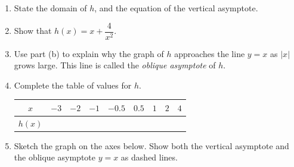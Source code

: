 \documentclass[12pt, twoside]{article}
\begin{document}
\begin{enumerate}[itemsep=0.4cm]
\begin{enumerate}[label=(\alph*), itemsep=0.25cm]
  \item State the domain of $h$, and the equation of the vertical
  asymptote.

  \vspace{0.5cm}

  \item Show that $\displaystyle h(x)=x+\dfrac{4}{x^2}$.

  \vspace{1.8cm}

  \item Use part (b) to explain why the graph of $h$ approaches
  the line $y=x$ as $|x|$ grows large. This line is called the
  \emph{oblique asymptote} of $h$.

  \vspace{1.6cm}

  \item Complete the table of values for $h$.
  \vspace{0.1cm}
  \begin{center}
  \renewcommand{\arraystretch}{1.4}
  \begin{tabular}{|c|c|c|c|c|c|c|c|c|}
  \hline
  $x$    & $-3$ & $-2$ & $-1$ & $-0.5$ & $0.5$ & $1$ & $2$ & $4$ \\
  \hline
  $h(x)$ & \phantom{XXX} & \phantom{XXX} & \phantom{XXX} & \phantom{XXX} & \phantom{XXX} & \phantom{XXX} & \phantom{XXX} & \phantom{XXX} \\
  \hline
  \end{tabular}
  \end{center}

  \item Sketch the graph on the axes below. Show both the vertical
  asymptote and the oblique asymptote $y=x$ as dashed lines.
\end{enumerate}

\begin{figure}[H]
\begin{center}
\end{center}
\end{figure}
\end{enumerate}
\end{document}
